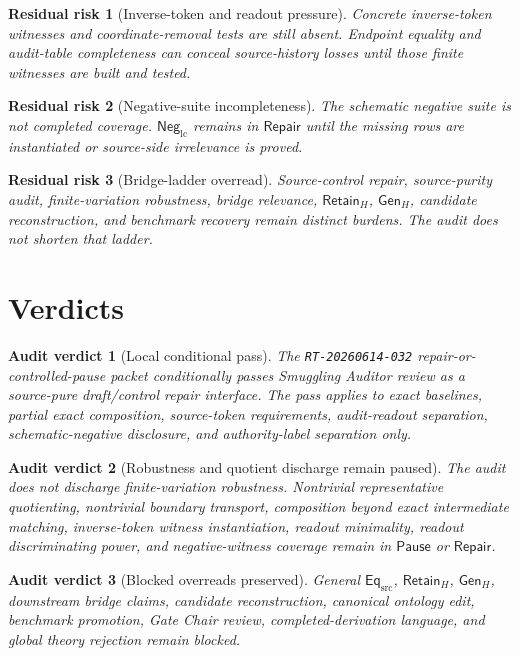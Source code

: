 \documentclass[11pt]{article}
\newcommand{\EqSrc}{\mathsf{Eq}_{\mathrm{src}}}
\newcommand{\NegLC}{\mathsf{Neg}_{\mathrm{lc}}}
\newcommand{\RetainH}{\mathsf{Retain}_{H}}
\newcommand{\GenH}{\mathsf{Gen}_{H}}
\newcommand{\Pause}{\mathsf{Pause}}
\newcommand{\Repair}{\mathsf{Repair}}
\newtheorem{residualrisk}{Residual risk}
\newtheorem{verdict}{Audit verdict}
\begin{document}
\begin{residualrisk}[Inverse-token and readout pressure]
Concrete inverse-token witnesses and coordinate-removal tests are still
absent. Endpoint equality and audit-table completeness can conceal
source-history losses until those finite witnesses are built and
tested.
\end{residualrisk}

\begin{residualrisk}[Negative-suite incompleteness]
The schematic negative suite is not completed coverage. \(\NegLC\)
remains in \(\Repair\) until the missing rows are instantiated or
source-side irrelevance is proved.
\end{residualrisk}

\begin{residualrisk}[Bridge-ladder overread]
Source-control repair, source-purity audit, finite-variation
robustness, bridge relevance, \(\RetainH\), \(\GenH\), candidate
reconstruction, and benchmark recovery remain distinct burdens. The
audit does not shorten that ladder.
\end{residualrisk}

\section{Verdicts}

\begin{verdict}[Local conditional pass]
The \texttt{RT-20260614-032} repair-or-controlled-pause packet
conditionally passes Smuggling Auditor review as a source-pure
draft/control repair interface. The pass applies to exact baselines,
partial exact composition, source-token requirements, audit-readout
separation, schematic-negative disclosure, and authority-label
separation only.
\end{verdict}

\begin{verdict}[Robustness and quotient discharge remain paused]
The audit does not discharge finite-variation robustness. Nontrivial
representative quotienting, nontrivial boundary transport,
composition beyond exact intermediate matching, inverse-token witness
instantiation, readout minimality, readout discriminating power, and
negative-witness coverage remain in \(\Pause\) or \(\Repair\).
\end{verdict}

\begin{verdict}[Blocked overreads preserved]
General \(\EqSrc\), \(\RetainH\), \(\GenH\), downstream bridge claims,
candidate reconstruction, canonical ontology edit, benchmark
promotion, Gate Chair review, completed-derivation language, and global
theory rejection remain blocked.
\end{verdict}
\end{document}
